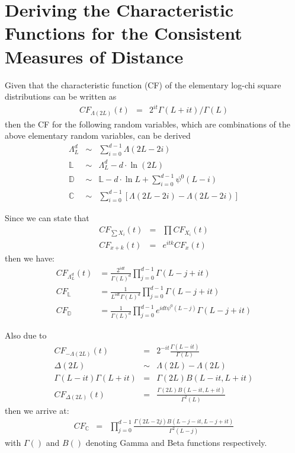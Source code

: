 \documentclass[journal,12pt,draftcls,onecolumn]{IEEEtran}
\begin{document}
\section{Deriving the Characteristic Functions for the Consistent Measures of Distance}
\label{sec:appendix_b}

Given that the characteristic function (CF) of the elementary log-chi square distributions can be written as
\begin{eqnarray}
 CF_{\Lambda(2L)}(t) &=& 2^{it}\Gamma(L+it)/\Gamma(L) \nonumber
\end{eqnarray}
  then the CF for the following random variables,
  which are combinations of the above elementary random variables, can be derived
\begin{eqnarray*}
   \Lambda^d_L &\sim&  \sum^{d-1}_{i=0} \Lambda(2L-2i) \\
  \mathbb{L} &\sim&  \Lambda^d_L -d \cdot \ln(2L) \\
  \mathbb{D} &\sim& \mathbb{L} - d \cdot \ln{L} + \sum^{d-1}_{i=0} \psi^0(L-i) \\
  \mathbb{C} &\sim&  \sum^{d-1}_{i=0} \left[ \Lambda(2L-2i) - \Lambda(2L-2i) \right]
\end{eqnarray*}

Since we can state that
\begin{eqnarray*}
 CF_{\sum X_i}(t)   &=& \prod CF_{X_i}(t) \\
 CF_{x+k}(t) &=& e^{itk}CF_x(t)
\end{eqnarray*}
then we have:
\begin{align}
  CF_{\Lambda^d_L}(t) &= \frac{2^{idt}}{\Gamma(L)^d} \prod^{d-1}_{j=0} \Gamma(L-j+it) \\
   CF_{\mathbb{L}} &= \frac{1}{L^{idt} \Gamma(L)^d}  \prod^{d-1}_{j=0} \Gamma(L-j+it) \\
   CF_{\mathbb{D}} &= \frac{ 1 }{\Gamma(L)^d} \prod^{d-1}_{j=0} e^{idt \psi^0(L-j)} \Gamma(L-j+it)  
\end{align}

Also due to
\begin{eqnarray*}
  CF_{-\Lambda(2L)}(t) &=& 2^{-it}\frac{\Gamma(L-it)}{\Gamma(L)} \\ 
  \Delta(2L) &\sim& \Lambda(2L) - \Lambda(2L) \\
  \Gamma(L-it) \Gamma(L+it) &=&  \Gamma(2L)B(L-it,L+it) \\
   CF_{\Delta(2L)}(t) &=& \frac{\Gamma(2L)B(L-it,L+it)}{\Gamma^2(L)} 
\end{eqnarray*}
then we arrive at:
\begin{align}
  CF_{\mathbb{C}} &=&  \prod^{d-1}_{j=0} \frac{\Gamma(2L-2j)B(L-j-it,L-j+it)}{\Gamma^2(L-j)} 
\end{align}
with $\Gamma()$ and $B()$ denoting Gamma and Beta functions respectively.
\end{document}
